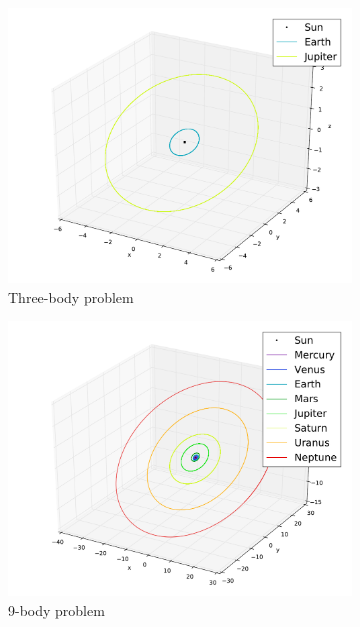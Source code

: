 \documentclass{article}
\begin{document}
\begin{figure}
\begin{subfigure}[b]{0.5\textwidth}
\centering
\includegraphics[width=1\linewidth]{fig/Three_Bodies.pdf}
\caption{Three-body problem}
\label{subfig:3body}
\end{subfigure}
\begin{subfigure}[b]{0.5\textwidth}
\centering
\includegraphics[width=1\linewidth]{fig/Solar_System.pdf}
\caption{9-body problem}
\label{subfig:9body}
\end{subfigure}
\begin{subfigure}[b]{0.5\textwidth}

\end{subfigure}
\end{figure}
\end{document}
